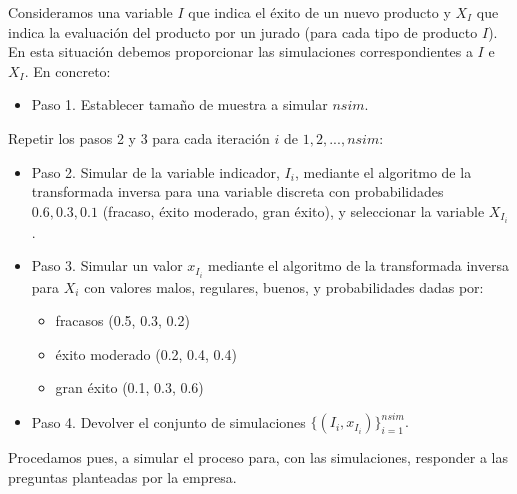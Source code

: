 \documentclass[
]{book}
\providecommand{\tightlist}{%
  \setlength{\itemsep}{0pt}\setlength{\parskip}{0pt}}
\newenvironment{silverbox}{
  \definecolor{shadecolor}{rgb}{192, 192, 192}  
  \color{black}
  \begin{shaded}}
 {\end{shaded}}
\theoremstyle{definition}
\theoremstyle{definition}
\theoremstyle{definition}
\theoremstyle{definition}
\theoremstyle{remark}
\begin{document}
\begin{silverbox}

Consideramos una variable \(I\) que indica el éxito de un nuevo producto y \(X_I\) que indica la evaluación del producto por un jurado (para cada tipo de producto \(I\)). En esta situación debemos proporcionar las simulaciones correspondientes a \(I\) e \(X_I\). En concreto:

\begin{itemize}
\tightlist
\item
  Paso 1. Establecer tamaño de muestra a simular \(nsim\).
\end{itemize}

Repetir los pasos 2 y 3 para cada iteración \(i\) de \(1, 2,..., nsim\):

\begin{itemize}
\item
  Paso 2. Simular de la variable indicador, \(I_i\), mediante el algoritmo de la transformada inversa para una variable discreta con probabilidades \(0.6, 0.3, 0.1\) (fracaso, éxito moderado, gran éxito), y seleccionar la variable \(X_{I_i}\).
\item
  Paso 3. Simular un valor \(x_{I_i}\) mediante el algoritmo de la transformada inversa para \(X_i\) con valores malos, regulares, buenos, y probabilidades dadas por:

  \begin{itemize}
  \tightlist
  \item
    fracasos (0.5, 0.3, 0.2)
  \item
    éxito moderado (0.2, 0.4, 0.4)
  \item
    gran éxito (0.1, 0.3, 0.6)
  \end{itemize}
\item
  Paso 4. Devolver el conjunto de simulaciones \(\{(I_i, x_{I_i})\}_{i=1}^{nsim}.\)
\end{itemize}

\end{silverbox}

Procedamos pues, a simular el proceso para, con las simulaciones, responder a las preguntas planteadas por la empresa.
\end{document}
